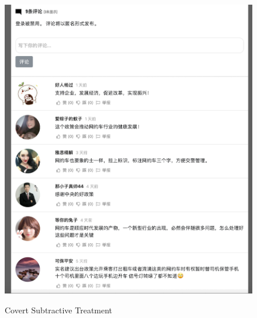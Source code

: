 \documentclass[11pt]{article}
\begin{document}
\begin{figure}
  \centering
  \caption{Covert Subtractive Treatment}
  \vspace{1em}
  \includegraphics[width=\textwidth]{figures/covert_subtractive.png}
  \label{CS}
\end{figure}
\end{document}

